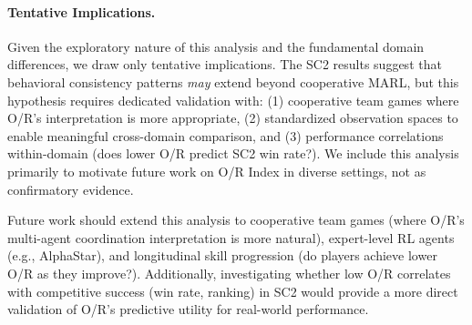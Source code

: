 \paragraph{Tentative Implications.}
Given the exploratory nature of this analysis and the fundamental domain differences, we draw only tentative implications. The SC2 results suggest that behavioral consistency patterns \textit{may} extend beyond cooperative MARL, but this hypothesis requires dedicated validation with: (1) cooperative team games where O/R's interpretation is more appropriate, (2) standardized observation spaces to enable meaningful cross-domain comparison, and (3) performance correlations within-domain (does lower O/R predict SC2 win rate?). We include this analysis primarily to motivate future work on O/R Index in diverse settings, not as confirmatory evidence.

Future work should extend this analysis to cooperative team games (where O/R's multi-agent coordination interpretation is more natural), expert-level RL agents (e.g., AlphaStar), and longitudinal skill progression (do players achieve lower O/R as they improve?). Additionally, investigating whether low O/R correlates with competitive success (win rate, ranking) in SC2 would provide a more direct validation of O/R's predictive utility for real-world performance.
